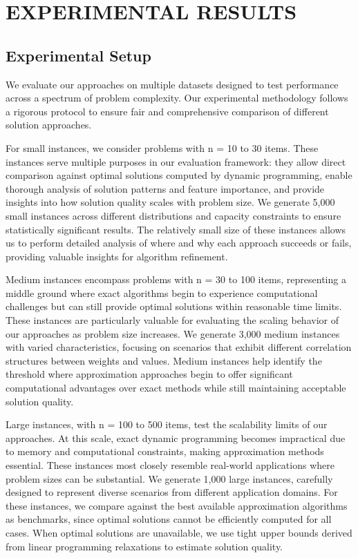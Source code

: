 \documentclass[conference, a4paper]{IEEEtran}
\begin{document}
\section{EXPERIMENTAL RESULTS}
\subsection{Experimental Setup}
We evaluate our approaches on multiple datasets designed to test performance across a spectrum of problem complexity. Our experimental methodology follows a rigorous protocol to ensure fair and comprehensive comparison of different solution approaches.

For small instances, we consider problems with n = 10 to 30 items. These instances serve multiple purposes in our evaluation framework: they allow direct comparison against optimal solutions computed by dynamic programming, enable thorough analysis of solution patterns and feature importance, and provide insights into how solution quality scales with problem size. We generate 5,000 small instances across different distributions and capacity constraints to ensure statistically significant results. The relatively small size of these instances allows us to perform detailed analysis of where and why each approach succeeds or fails, providing valuable insights for algorithm refinement.

Medium instances encompass problems with n = 30 to 100 items, representing a middle ground where exact algorithms begin to experience computational challenges but can still provide optimal solutions within reasonable time limits. These instances are particularly valuable for evaluating the scaling behavior of our approaches as problem size increases. We generate 3,000 medium instances with varied characteristics, focusing on scenarios that exhibit different correlation structures between weights and values. Medium instances help identify the threshold where approximation approaches begin to offer significant computational advantages over exact methods while still maintaining acceptable solution quality.

Large instances, with n = 100 to 500 items, test the scalability limits of our approaches. At this scale, exact dynamic programming becomes impractical due to memory and computational constraints, making approximation methods essential. These instances most closely resemble real-world applications where problem sizes can be substantial. We generate 1,000 large instances, carefully designed to represent diverse scenarios from different application domains. For these instances, we compare against the best available approximation algorithms as benchmarks, since optimal solutions cannot be efficiently computed for all cases. When optimal solutions are unavailable, we use tight upper bounds derived from linear programming relaxations to estimate solution quality.
\end{document}

